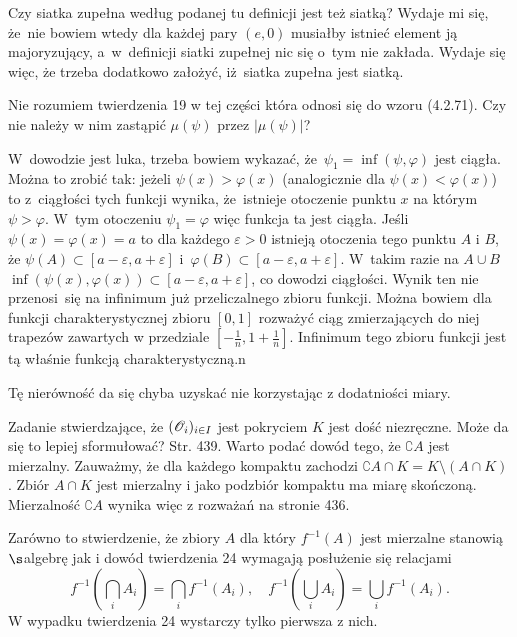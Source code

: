 \documentclass[a4paper,11pt]{article}
\newcommand{\veps}{\varepsilon}
\newcommand{\vp}{\varphi}
\begin{document}
\start {} Czy siatka zupełna według podanej tu definicji jest
też siatką? Wydaje mi się, że~nie bowiem wtedy dla każdej pary
$(e, 0)$ musiałby istnieć element ją majoryzujący, a~w~definicji
siatki zupełnej nic się o~tym nie zakłada. Wydaje się więc, że trzeba
dodatkowo założyć, iż~siatka zupełna jest siatką.

\start {} Nie rozumiem twierdzenia 19 w tej części która odnosi
się do wzoru (4.2.71). Czy nie należy w nim zastąpić $\mu( \psi )$
przez $| \mu( \psi ) |$?

\start {} W~dowodzie jest luka, trzeba bowiem wykazać,
że~$\psi_{ 1 } = \inf( \psi, \vp )$ jest ciągła. Można to zrobić tak:
jeżeli $\psi( x ) > \vp( x )$ (analogicznie dla
$\psi( x ) < \varphi( x )$) to z~ciągłości tych funkcji wynika,
że~istnieje otoczenie punktu $x$ na którym $\psi > \vp$. W~tym
otoczeniu $\psi_{ 1 } = \vp$ więc funkcja ta jest ciągła. Jeśli
$\psi( x ) = \vp( x ) = a$ to dla każdego $\veps > 0$ istnieją
otoczenia tego punktu $A$ i $B$, że
$\psi( A ) \subset [ a - \veps, a + \veps ]$
i~$\varphi( B ) \subset [ a - \veps, a + \veps ]$. W~takim razie na
$A \cup B$
$\inf( \psi( x ), \vp( x ) ) \subset [ a - \veps, a + \veps ]$, co
dowodzi ciągłości. Wynik ten nie przenosi~się na infinimum już
przeliczalnego zbioru funkcji. Można bowiem dla funkcji
charakterystycznej zbioru $[0, 1]$ rozważyć ciąg zmierzających do niej
trapezów zawartych w przedziale
$[-\frac{ 1 }{ n }, 1 + \frac{ 1 }{ n } ]$. Infinimum tego zbioru
funkcji jest tą właśnie funkcją charakterystyczną.n

\start {} Tę nierówność da się chyba uzyskać nie korzystając z
dodatniości miary.

\start {} Zadanie stwierdzające, że
$( \mathcal{O}_{ i } )_{ i \in I }$ jest pokryciem $K$ jest dość
niezręczne. Może da się to lepiej sformułować? \start Str. 439. Warto
podać dowód tego, że $\complement A$ jest mierzalny. Zauważmy, że dla
każdego kompaktu zachodzi
$\complement A \cap K = K \setminus ( A \cap K )$. Zbiór $A \cap K$
jest mierzalny i jako podzbiór kompaktu ma miarę skończoną.
Mierzalność $\complement A$ wynika więc z rozważań na stronie 436.

\start {} Zarówno to stwierdzenie, że zbiory $A$ dla który
$f^{ -1 }( A )$ jest mierzalne stanowią $\s$\dywiz algebrę jak i dowód
twierdzenia 24 wymagają posłużenie się relacjami
\begin{displaymath}
  f^{ -1 }( \bigcap_{ i } A_{ i } ) = \bigcap_{ i } f^{ -1 }( A_{ i } ),
  \quad f^{ -1 }( \bigcup_{ i } A_{ i } ) = \bigcup_{ i }
  f^{ -1 }( A_{ i } ).
\end{displaymath}
W wypadku twierdzenia 24 wystarczy tylko pierwsza z nich.
\end{document}
